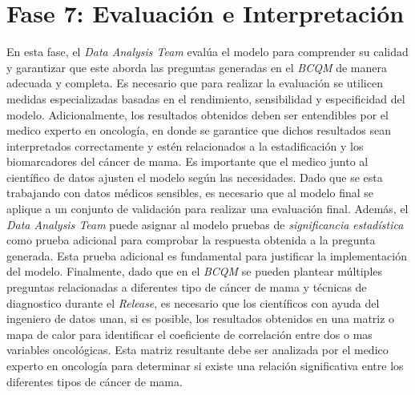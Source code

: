 \section{Fase 7: Evaluación e Interpretación}
En esta fase, el \textit{Data Analysis Team} evalúa el modelo para comprender su calidad y garantizar que este aborda las preguntas generadas en el \textit{BCQM} de manera adecuada y completa. Es necesario que para realizar la evaluación se utilicen medidas especializadas basadas en el rendimiento, sensibilidad y especificidad del modelo. Adicionalmente, los resultados obtenidos deben ser entendibles por el medico experto en oncología, en donde se garantice que dichos resultados sean interpretados correctamente y estén relacionados a la estadificación y los biomarcadores del cáncer de mama. Es importante que el medico junto al científico de datos ajusten el modelo según las necesidades. Dado que se esta trabajando con datos médicos sensibles, es necesario que al modelo final se aplique a un conjunto de validación para realizar una evaluación final. Además, el \textit{Data Analysis Team} puede asignar al modelo pruebas de \textit{significancia estadística} como prueba adicional para comprobar la respuesta obtenida a la pregunta generada. Esta prueba adicional es fundamental para justificar la implementación del modelo. Finalmente, dado que en el \textit{BCQM} se pueden plantear múltiples preguntas relacionadas a diferentes tipo de cáncer de mama y técnicas de diagnostico durante el \textit{Release}, es necesario que los científicos con ayuda del ingeniero de datos unan, si es posible, los resultados obtenidos en una matriz o mapa de calor para identificar el coeficiente de correlación entre dos o mas variables oncológicas. Esta matriz resultante debe ser analizada por el medico experto en oncología para determinar si existe una relación significativa entre los diferentes tipos de cáncer de mama.

